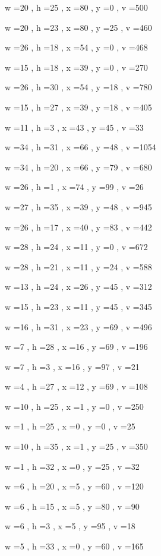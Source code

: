 \documentclass[11pt]{article}
\begin{document}
w =20 , h =25 , x =80 , y =0 , v =500
\par
w =20 , h =23 , x =80 , y =25 , v =460
\par
w =26 , h =18 , x =54 , y =0 , v =468
\par
w =15 , h =18 , x =39 , y =0 , v =270
\par
w =26 , h =30 , x =54 , y =18 , v =780
\par
w =15 , h =27 , x =39 , y =18 , v =405
\par
w =11 , h =3 , x =43 , y =45 , v =33
\par
w =34 , h =31 , x =66 , y =48 , v =1054
\par
w =34 , h =20 , x =66 , y =79 , v =680
\par
w =26 , h =1 , x =74 , y =99 , v =26
\par
w =27 , h =35 , x =39 , y =48 , v =945
\par
w =26 , h =17 , x =40 , y =83 , v =442
\par
w =28 , h =24 , x =11 , y =0 , v =672
\par
w =28 , h =21 , x =11 , y =24 , v =588
\par
w =13 , h =24 , x =26 , y =45 , v =312
\par
w =15 , h =23 , x =11 , y =45 , v =345
\par
w =16 , h =31 , x =23 , y =69 , v =496
\par
w =7 , h =28 , x =16 , y =69 , v =196
\par
w =7 , h =3 , x =16 , y =97 , v =21
\par
w =4 , h =27 , x =12 , y =69 , v =108
\par
w =10 , h =25 , x =1 , y =0 , v =250
\par
w =1 , h =25 , x =0 , y =0 , v =25
\par
w =10 , h =35 , x =1 , y =25 , v =350
\par
w =1 , h =32 , x =0 , y =25 , v =32
\par
w =6 , h =20 , x =5 , y =60 , v =120
\par
w =6 , h =15 , x =5 , y =80 , v =90
\par
w =6 , h =3 , x =5 , y =95 , v =18
\par
w =5 , h =33 , x =0 , y =60 , v =165
\par
\newpage
\end{document}
